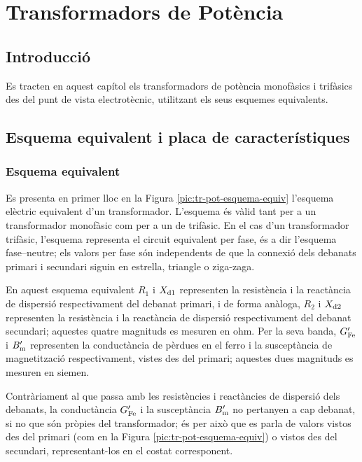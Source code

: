 \chapter{Transformadors de Potència}

\section{Introducció}
Es tracten en aquest capítol els transformadors de potència
monofàsics i trifàsics des del punt de vista electrotècnic, utilitzant els seus esquemes equivalents.

\section{Esquema equivalent i placa de característiques}

\subsection{Esquema equivalent}

Es presenta en primer lloc en la Figura \vref{pic:tr-pot-esquema-equiv} l'esquema elèctric equivalent d'un transformador.
L'esquema és vàlid tant per a un transformador monofàsic com per a un de trifàsic. En el cas d'un transformador trifàsic, l'esquema representa el circuit equivalent per fase, és a dir l'esquema fase--neutre; els valors per fase són independents de que la connexió dels debanats primari i secundari siguin en estrella, triangle o ziga-zaga.

\begin{center}
    
    \label{pic:tr-pot-esquema-equiv}
\end{center}

En aquest esquema equivalent $R_1$ i $X_\mathrm{d1}$ representen la resistència i la reactància de dispersió respectivament del debanat primari, i de forma anàloga, $R_2$ i $X_\mathrm{d2}$ representen la resistència i la reactància de dispersió respectivament del debanat secundari; aquestes quatre magnituds es mesuren en ohm. Per la seva banda, $G_\mathrm{Fe}'$ i $B_\mathrm{m}'$ representen la conductància de pèrdues en el ferro i la susceptància de magnetització respectivament, vistes des del primari; aquestes dues magnituds es mesuren en siemen.

Contràriament al que passa amb les resistències i reactàncies de dispersió dels debanats, la conductància $G_\mathrm{Fe}'$ i la susceptància $B_\mathrm{m}'$ no pertanyen a cap debanat, si no que són pròpies del transformador; és per això que es parla de valors vistos des del primari (com en la Figura \vref{pic:tr-pot-esquema-equiv}) o vistos des del secundari, representant-los en el costat corresponent.

